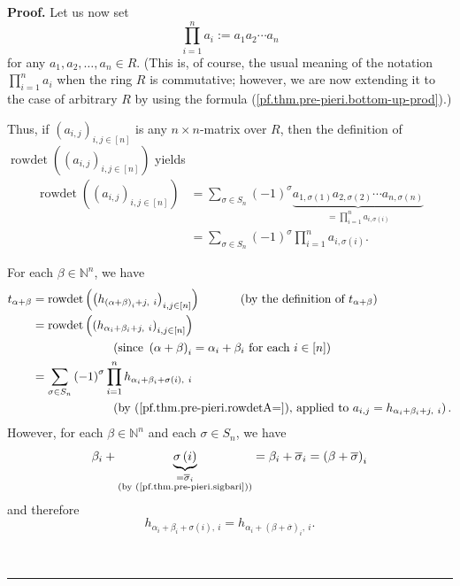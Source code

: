 \documentclass[numbers=enddot,12pt,final,onecolumn,notitlepage,english]{scrartcl}%
\theoremstyle{definition}
\newenvironment{proof}[1][Proof]{\noindent\textbf{#1.} }{\ \rule{0.5em}{0.5em}}
\let\sumnonlimits\sum
\let\prodnonlimits\prod
\renewcommand{\sum}{\sumnonlimits\limits}
\renewcommand{\prod}{\prodnonlimits\limits}
\newenvironment{verlong}{}{}
\begin{document}
\begin{verlong}
\begin{proof}
Let us now set%
\begin{equation}
\prod_{i=1}^{n}a_{i}:=a_{1}a_{2}\cdots a_{n}
\label{pf.thm.pre-pieri.bottom-up-prod}%
\end{equation}
for any $a_{1},a_{2},\ldots,a_{n}\in R$. (This is, of course, the usual
meaning of the notation $\prod_{i=1}^{n}a_{i}$ when the ring $R$ is
commutative; however, we are now extending it to the case of arbitrary $R$ by
using the formula (\ref{pf.thm.pre-pieri.bottom-up-prod}).)

Thus, if $\left(  a_{i,j}\right)  _{i,j\in\left[  n\right]  }$ is any $n\times
n$-matrix over $R$, then the definition of $\operatorname*{rowdet}\left(
\left(  a_{i,j}\right)  _{i,j\in\left[  n\right]  }\right)  $ yields%
\begin{align}
\operatorname*{rowdet}\left(  \left(  a_{i,j}\right)  _{i,j\in\left[
n\right]  }\right)   &  =\sum_{\sigma\in S_{n}}\left(  -1\right)  ^{\sigma
}\underbrace{a_{1,\sigma\left(  1\right)  }a_{2,\sigma\left(  2\right)
}\cdots a_{n,\sigma\left(  n\right)  }}_{=\prod_{i=1}^{n}a_{i,\sigma\left(
i\right)  }}\nonumber\\
&  =\sum_{\sigma\in S_{n}}\left(  -1\right)  ^{\sigma}\prod_{i=1}%
^{n}a_{i,\sigma\left(  i\right)  }. \label{pf.thm.pre-pieri.rowdetA=}%
\end{align}


For each $\beta\in\mathbb{N}^{n}$, we have%
\begin{align}
t_{\alpha+\beta}  &  =\operatorname*{rowdet}\left(  \left(  h_{\left(
\alpha+\beta\right)  _{i}+j,\ i}\right)  _{i,j\in\left[  n\right]  }\right)
\ \ \ \ \ \ \ \ \ \ \left(  \text{by the definition of }t_{\alpha+\beta
}\right) \nonumber\\
&  =\operatorname*{rowdet}\left(  \left(  h_{\alpha_{i}+\beta_{i}%
+j,\ i}\right)  _{i,j\in\left[  n\right]  }\right) \nonumber\\
&  \ \ \ \ \ \ \ \ \ \ \ \ \ \ \ \ \ \ \ \ \left(  \text{since }\left(
\alpha+\beta\right)  _{i}=\alpha_{i}+\beta_{i}\text{ for each }i\in\left[
n\right]  \right) \nonumber\\
&  =\sum_{\sigma\in S_{n}}\left(  -1\right)  ^{\sigma}\prod_{i=1}^{n}%
h_{\alpha_{i}+\beta_{i}+\sigma\left(  i\right)  ,\ i}%
\label{pf.thm.pre-pieri.t1}\\
&  \ \ \ \ \ \ \ \ \ \ \ \ \ \ \ \ \ \ \ \ \left(  \text{by
(\ref{pf.thm.pre-pieri.rowdetA=}), applied to }a_{i,j}=h_{\alpha_{i}+\beta
_{i}+j,\ i}\right)  .\nonumber
\end{align}
However, for each $\beta\in\mathbb{N}^{n}$ and each $\sigma\in S_{n}$, we have%
\[
\beta_{i}+\underbrace{\sigma\left(  i\right)  }_{\substack{=\overline{\sigma
}_{i}\\\text{(by (\ref{pf.thm.pre-pieri.sigbari}))}}}=\beta_{i}+\overline
{\sigma}_{i}=\left(  \beta+\overline{\sigma}\right)  _{i}%
\]
and therefore%
\begin{equation}
h_{\alpha_{i}+\beta_{i}+\sigma\left(  i\right)  ,\ i}=h_{\alpha_{i}+\left(
\beta+\overline{\sigma}\right)  _{i},\ i}. \label{pf.thm.pre-pieri.h=h1}%
\end{equation}



\end{proof}
\end{verlong}
\end{document}
